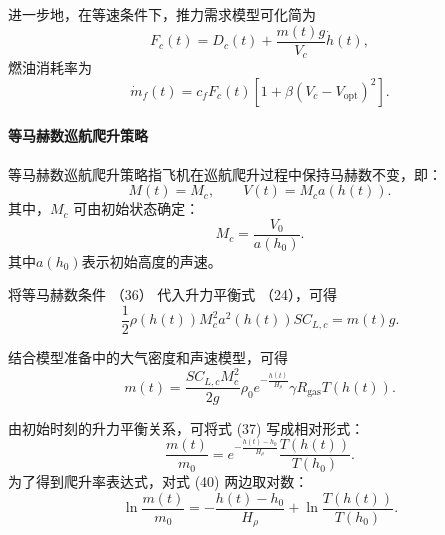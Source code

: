 \documentclass[UTF8]{ctexart}
\begin{document}
进一步地，在等速条件下，推力需求模型可化简为
\begin{equation}
    F_c(t)
    =
    D_c(t)
    +
    \frac{m(t)g}{V_c}\dot h(t),
    \label{eq:constant_speed_thrust}
\end{equation}
燃油消耗率为
\begin{equation}
    \dot m_f(t)
    =
    c_fF_c(t)
    \left[
    1+\beta\left(V_c-V_{\mathrm{opt}}\right)^2
    \right].
    \label{eq:constant_speed_fuel}
\end{equation}

\paragraph{等马赫数巡航爬升策略}

等马赫数巡航爬升策略指飞机在巡航爬升过程中保持马赫数不变，即：
\begin{equation}
    M(t)=M_c,
    \qquad
    V(t)=M_ca(h(t)).
    \label{eq:constant_mach_condition}
\end{equation}
其中，$M_c$ 可由初始状态确定：
\begin{equation}
    M_c=\frac{V_0}{a(h_0)}.
    \label{eq:Mc_initial}
\end{equation}
其中$a(h_0)$表示初始高度的声速。

将等马赫数条件 （36） 代入升力平衡式
（24），可得
\begin{equation}
    \frac{1}{2}
    \rho(h(t))
    M_c^2a^2(h(t))
    S C_{L,c}
    =
    m(t)g.
    \label{eq:constant_mach_lift_balance}
\end{equation}

结合模型准备中的大气密度和声速模型，可得
\begin{equation}
    m(t)
    =
    \frac{S C_{L,c}M_c^2}{2g}
    \rho_0 e^{-\frac{h(t)}{H_\rho}}
    \gamma R_{\mathrm{gas}}T(h(t)).
    \label{eq:constant_mach_m_h}
\end{equation}

由初始时刻的升力平衡关系，可将式 (37) 写成相对形式：
\begin{equation}
    \frac{m(t)}{m_0}
    =
    e^{-\frac{h(t)-h_0}{H_\rho}}
    \frac{T(h(t))}{T(h_0)}.
    \label{eq:constant_mach_relative}
\end{equation}
为了得到爬升率表达式，对式 (40) 两边取对数：
\begin{equation}
    \ln\frac{m(t)}{m_0}
    =
    -\frac{h(t)-h_0}{H_\rho}
    +
    \ln\frac{T(h(t))}{T(h_0)}.
    \label{eq:constant_mach_log}
\end{equation}
\end{document}

